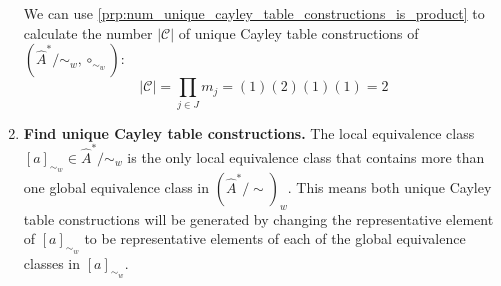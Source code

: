 \begin{proofE}
\begin{enumerate}
    We can use \cref{prp:num_unique_cayley_table_constructions_is_product} to calculate the number $|\mathcal{C}|$ of unique Cayley table constructions of $(\hat{A}^{*}/\sim_{w}, \circ_{\sim_{w}})$:
    \begin{equation}
        |\mathcal{C}| = \prod_{j \in J} m_{j} = (1)(2)(1)(1) = 2
    \end{equation}

    \item \textbf{Find unique Cayley table constructions.}
    The local equivalence class $[a]_{\sim_{w}} \in \hat{A}^{*}/\sim_{w}$ is the only local equivalence class that contains more than one global equivalence class in $(\hat{A}^{*}/\sim)_{w}$.
    This means both unique Cayley table constructions will be generated by changing the representative element of $[a]_{\sim_{w}}$ to be representative elements of each of the global equivalence classes in $[a]_{\sim_{w}}$.


\end{enumerate}
\end{proofE}
